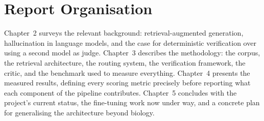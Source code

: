 \section{Report Organisation}\label{1.7}

Chapter~2 surveys the relevant background: retrieval-augmented
generation, hallucination in language models, and the case for
deterministic verification over using a second model as judge. Chapter~3
describes the methodology: the corpus, the retrieval architecture, the
routing system, the verification framework, the critic, and the
benchmark used to measure everything. Chapter~4 presents the measured
results, defining every scoring metric precisely before reporting what
each component of the pipeline contributes. Chapter~5 concludes with the
project's current status, the fine-tuning work now under way, and a
concrete plan for generalising the architecture beyond biology.
